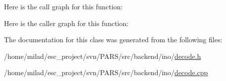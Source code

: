 Here is the call graph for this function:




Here is the caller graph for this function:




The documentation for this class was generated from the following files:\begin{DoxyCompactItemize}
\item 
/home/milad/esc\_\-project/svn/PARS/src/backend/ino/\hyperlink{ino_2decode_8h}{decode.h}\item 
/home/milad/esc\_\-project/svn/PARS/src/backend/ino/\hyperlink{ino_2decode_8cpp}{decode.cpp}\end{DoxyCompactItemize}
